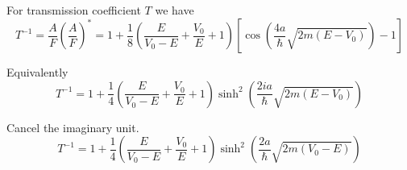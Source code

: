For transmission coefficient $T$ we have
\begin{equation*}
T^{-1}=\frac{A}{F}\left(\frac{A}{F}\right)^*
=1+\frac{1}{8}\left(\frac{E}{V_0-E}+\frac{V_0}{E}+1\right)
\left[\cos\left(\frac{4a}{\hbar}\sqrt{2m(E-V_0)}\right)-1\right]
\tag{5}
\end{equation*}

Equivalently
\begin{equation*}
T^{-1}=1+\frac{1}{4}\left(\frac{E}{V_0-E}+\frac{V_0}{E}+1\right)
\sinh^2\left(\frac{2ia}{\hbar}\sqrt{2m(E-V_0)}\right)
\tag{6}
\end{equation*}

Cancel the imaginary unit.
\begin{equation*}
T^{-1}=1+\frac{1}{4}\left(\frac{E}{V_0-E}+\frac{V_0}{E}+1\right)
\sinh^2\left(\frac{2a}{\hbar}\sqrt{2m(V_0-E)}\right)
\end{equation*}


